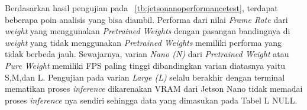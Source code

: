 \par Berdasarkan hasil pengujian pada ~\ref{tb:jetsonanoperformancetest}, terdapat beberapa poin analisis yang bisa diambil.
Performa dari nilai \emph{Frame Rate} dari \emph{weight} yang menggunakan \emph{Pretrained Weights} dengan pasangan bandingnya di \emph{weight}
yang tidak menggunakan \emph{Pretrained Weights} memiliki performa yang tidak berbeda jauh. Sewajarnya, varian \emph{Nano (N)} dari
\emph{Pretrained Weight} atau \emph{Pure Weight} memiliki FPS paling tinggi dibandingkan varian diatasnya yaitu S,M,dan L.
Pengujian pada varian \emph{Large (L)} selalu berakhir dengan terminal mematikan proses \emph{inference}
dikarenakan VRAM dari Jetson Nano tidak memadai proses \emph{inference} nya sendiri sehingga data yang dimasukan pada Tabel L NULL.